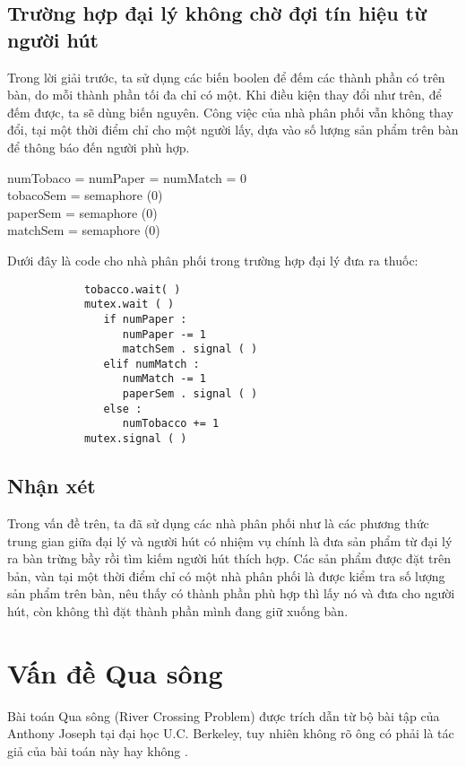 \documentclass[a4paper]{article}
\begin{document}
	\subsection{Trường hợp đại lý không chờ đợi tín hiệu từ người hút}
	Trong lời giải trước, ta sử dụng các biến boolen để đếm các thành phần có trên bàn, do mỗi thành phần
	tối đa chỉ có một. Khi điều kiện thay đổi như trên, để đếm được, ta sẽ dùng biến nguyên. Công việc của 
	nhà phân phối vẫn không thay đổi, tại một thời điểm chỉ cho một người lấy, dựa vào số lượng sản phẩm 
	trên bàn để thông báo đến người phù hợp.
	\begin{tcolorbox}
	numTobaco = numPaper = numMatch = 0 \\
	tobacoSem = semaphore (0) \\
	paperSem = semaphore (0) \\
	matchSem = semaphore (0)
	\end{tcolorbox}
	Dưới đây là code cho nhà phân phối trong trường hợp đại lý đưa ra thuốc: \\
	\begin{tcolorbox}
		\begin{verbatim}
		 	tobacco.wait( )
			mutex.wait ( )
			   if numPaper :
			      numPaper -= 1
			      matchSem . signal ( )
			   elif numMatch :
			      numMatch -= 1
			      paperSem . signal ( )
			   else :
			      numTobacco += 1
			mutex.signal ( )
		\end{verbatim}
	\end{tcolorbox}	
	
	\subsection{Nhận xét}
	Trong vấn đề trên, ta đã sử dụng các nhà phân phối như là các phương thức trung gian giữa đại lý và người hút 
	có nhiệm vụ chính là đưa sản phẩm từ đại lý ra bàn trừng bầy rồi tìm kiếm người hút thích hợp. Các sản phẩm được đặt 			trên bản, vàn tại một thời điểm chỉ 
	có một nhà phân phối là được kiểm tra số lượng sản phẩm trên bàn, nêu thấy có thành phần phù hợp thì lấy nó và
	đưa cho người hút, còn không thì đặt thành phần mình đang giữ xuống bàn. 
	
	\pagebreak
	\section{Vấn đề Qua sông}
	Bài toán Qua sông (River Crossing Problem) được trích dẫn từ bộ bài tập của Anthony Joseph tại đại học U.C. Berkeley, 
	tuy nhiên không rõ ông có phải là tác giả của bài toán này hay không \cite{littlebook5}.
	
\end{document}

